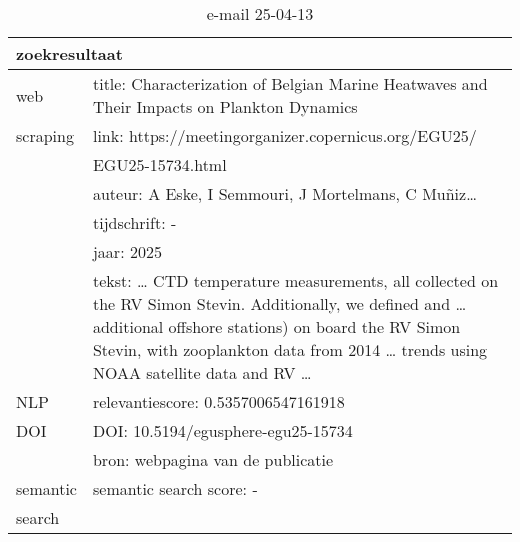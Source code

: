 \begin{table}[h!]
    \caption{e-mail 25-04-13}
    \centering
    \begin{tabularx}{\textwidth}{|p{4cm}|X|} 
        \hline
        \multicolumn{2}{|X|}{\textbf{zoekresultaat}} \\
        \hline
        web &title: Characterization of Belgian Marine Heatwaves and Their Impacts on Plankton Dynamics\\
        scraping&link: https://meetingorganizer.copernicus.org/EGU25/\\&EGU25-15734.html\\
        &auteur: A Eske, I Semmouri, J Mortelmans, C Muñiz…\\
        &tijdschrift: -\\
        &jaar: 2025\\
        &tekst: … CTD temperature measurements, all collected on the RV Simon Stevin. Additionally, we defined and … additional offshore stations) on board the RV Simon Stevin, with zooplankton data from 2014 … trends using NOAA satellite data and RV …\\
        \hline
        NLP&relevantiescore: 0.5357006547161918\\
        \hline
        DOI&DOI: 10.5194/egusphere-egu25-15734\\
        &bron: webpagina van de publicatie\\
        \hline
        semantic&semantic search score: -\\
        search&\\
        \hline
    \end{tabularx}
    \label{table:email20250413}
\end{table}
